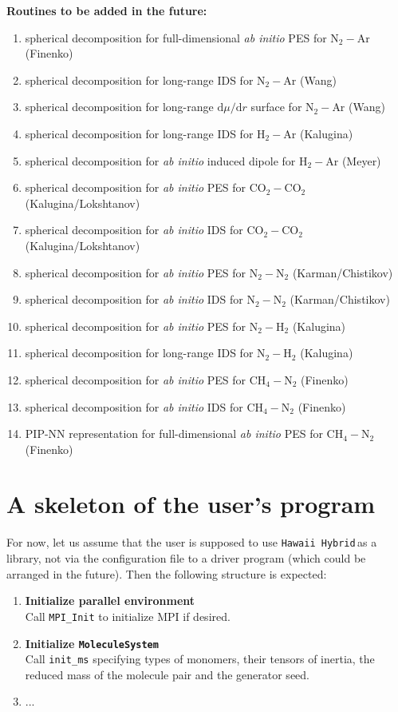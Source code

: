 \documentclass[color]{article}
\newcommand{\libname}{\texttt{Hawaii Hybrid}\,}
\begin{document}
\noindent
{\textbf{Routines to be added in the future:}}
\begin{enumerate}
\item spherical decomposition for full-dimensional \textit{ab initio} PES for N$_2-$Ar (Finenko)
\item spherical decomposition for long-range IDS for N$_2-$Ar (Wang)
\item spherical decomposition for long-range $\textrm{d}\mu/\textrm{d}r$ surface for N$_2-$Ar (Wang)
\item spherical decomposition for long-range IDS for H$_2-$Ar (Kalugina)
\item spherical decomposition for \textit{ab initio} induced dipole for H$_2-$Ar (Meyer)
\item spherical decomposition for \textit{ab initio} PES for CO$_2-$CO$_2$ (Kalugina/Lokshtanov)
\item spherical decomposition for \textit{ab initio} IDS for CO$_2-$CO$_2$ (Kalugina/Lokshtanov)
\item spherical decomposition for \textit{ab initio} PES for N$_2-$N$_2$ (Karman/Chistikov)
\item spherical decomposition for \textit{ab initio} IDS for N$_2-$N$_2$ (Karman/Chistikov)
\item spherical decomposition for \textit{ab initio} PES for N$_2-$H$_2$ (Kalugina)
\item spherical decomposition for long-range IDS for N$_2-$H$_2$ (Kalugina)
\item spherical decomposition for \textit{ab initio} PES for CH$_4-$N$_2$ (Finenko)
\item spherical decomposition for \textit{ab initio} IDS for CH$_4-$N$_2$ (Finenko)
\item PIP-NN representation for full-dimensional \textit{ab initio} PES for CH$_4-$N$_2$ (Finenko)
\end{enumerate}



\section{A skeleton of the user's program}
\label{sec:user-program}

For now, let us assume that the user is supposed to use \libname as a library, not via the configuration file to a driver program (which could be arranged in the future). Then the following structure is expected:

\begin{enumerate}

\item \textbf{Initialize parallel environment} \\
Call \texttt{MPI\_Init} to initialize MPI if desired.

\item \textbf{Initialize \texttt{MoleculeSystem}} \\
Call \texttt{init\_ms} specifying types of monomers, their tensors of inertia, the reduced mass of the molecule pair and the generator seed.

\item ...

\end{enumerate}
\end{document}
